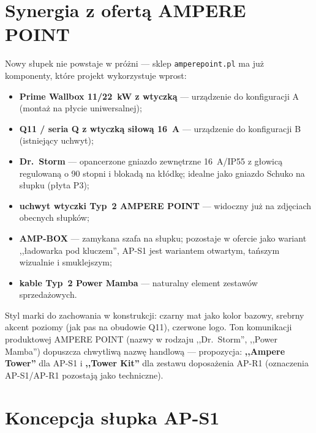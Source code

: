 \documentclass[11pt,a4paper]{article}
\begin{document}
\section{Synergia z ofertą AMPERE POINT}
Nowy słupek nie powstaje w próżni --- sklep \texttt{amperepoint.pl} ma już komponenty, które projekt
wykorzystuje wprost:
\begin{itemize}
\item \textbf{Prime Wallbox 11/22~kW z wtyczką} --- urządzenie do konfiguracji A (montaż na płycie
uniwersalnej);
\item \textbf{Q11 / seria Q z wtyczką siłową 16~A} --- urządzenie do konfiguracji B (istniejący uchwyt);
\item \textbf{Dr.~Storm} --- opancerzone gniazdo zewnętrzne 16~A/IP55 z głowicą regulowaną o 90 stopni
i blokadą na kłódkę; idealne jako gniazdo Schuko na słupku (płyta P3);
\item \textbf{uchwyt wtyczki Typ~2 AMPERE POINT} --- widoczny już na zdjęciach obecnych słupków;
\item \textbf{AMP-BOX} --- zamykana szafa na słupku; pozostaje w ofercie jako wariant ,,ładowarka pod
kluczem'', AP-S1 jest wariantem otwartym, tańszym wizualnie i smuklejszym;
\item \textbf{kable Typ~2 Power Mamba} --- naturalny element zestawów sprzedażowych.
\end{itemize}
Styl marki do zachowania w konstrukcji: czarny mat jako kolor bazowy, srebrny akcent poziomy
(jak pas na obudowie Q11), czerwone logo. Ton komunikacji produktowej AMPERE POINT (nazwy w rodzaju
,,Dr.~Storm'', ,,Power Mamba'') dopuszcza chwytliwą nazwę handlową --- propozycja: \textbf{,,Ampere
Tower''} dla AP-S1 i \textbf{,,Tower Kit''} dla zestawu doposażenia AP-R1 (oznaczenia AP-S1/AP-R1
pozostają jako techniczne).

\section{Koncepcja słupka AP-S1}
\end{document}
